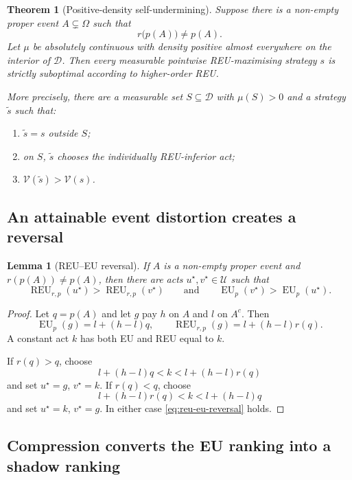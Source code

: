 \documentclass[11pt,a4paper]{article}
\newtheorem{theorem}{Theorem}[section]
\newtheorem{lemma}[lemma]{Lemma}
\theoremstyle{definition}
\newcommand{\REU}{\operatorname{REU}}
\newcommand{\EU}{\operatorname{EU}}
\newcommand{\V}{\mathcal V}
\newcommand{\D}{\mathcal D}
\newcommand{\U}{\mathcal U}
\begin{document}
\begin{theorem}[Positive-density self-undermining]\label{thm:main}
Suppose there is a non-empty proper event $A\subsetneq\Omega$ such that
\[
 r\bigl(p(A)\bigr)\neq p(A).
\]
Let $\mu$ be absolutely continuous with density positive almost everywhere on
the interior of $\D$. Then every measurable pointwise REU-maximising strategy
$s$ is strictly suboptimal according to higher-order REU.

More precisely, there are a measurable set $S\subseteq\D$ with $\mu(S)>0$
and a strategy $\widetilde s$ such that:
\begin{enumerate}[label=(\roman*)]
 \item $\widetilde s=s$ outside $S$;
 \item on $S$, $\widetilde s$ chooses the individually REU-inferior act;
 \item $\V(\widetilde s)>\V(s)$.
\end{enumerate}
\end{theorem}

\subsection{An attainable event distortion creates a reversal}

\begin{lemma}[REU--EU reversal]\label{lem:reu-eu-reversal}
If $A$ is a non-empty proper event and
$r(p(A))\neq p(A)$, then there are acts $u^\star,v^\star\in\U$ such that
\begin{equation}\label{eq:reu-eu-reversal}
 \REU_{r,p}(u^\star)>\REU_{r,p}(v^\star)
 \qquad\text{and}\qquad
 \EU_p(v^\star)>\EU_p(u^\star).
\end{equation}
\end{lemma}

\begin{proof}
Let $q=p(A)$ and let $g$ pay $h$ on $A$ and $l$ on $A^c$. Then
\[
 \EU_p(g)=l+(h-l)q,
 \qquad
 \REU_{r,p}(g)=l+(h-l)r(q).
\]
A constant act $k$ has both EU and REU equal to $k$.

If $r(q)>q$, choose
\[
 l+(h-l)q<k<l+(h-l)r(q)
\]
and set $u^\star=g$, $v^\star=k$. If $r(q)<q$, choose
\[
 l+(h-l)r(q)<k<l+(h-l)q
\]
and set $u^\star=k$, $v^\star=g$. In either case
\eqref{eq:reu-eu-reversal} holds.
\end{proof}

\subsection{Compression converts the EU ranking into a shadow ranking}
\end{document}

